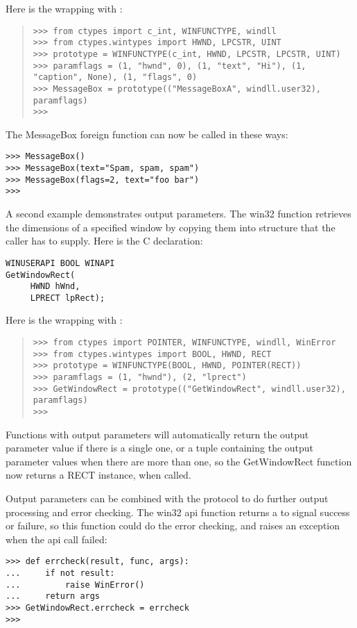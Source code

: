 Here is the wrapping with :
\begin{quote}
\begin{verbatim}>>> from ctypes import c_int, WINFUNCTYPE, windll
>>> from ctypes.wintypes import HWND, LPCSTR, UINT
>>> prototype = WINFUNCTYPE(c_int, HWND, LPCSTR, LPCSTR, UINT)
>>> paramflags = (1, "hwnd", 0), (1, "text", "Hi"), (1, "caption", None), (1, "flags", 0)
>>> MessageBox = prototype(("MessageBoxA", windll.user32), paramflags)
>>>\end{verbatim}
\end{quote}

The MessageBox foreign function can now be called in these ways:
\begin{verbatim}
>>> MessageBox()
>>> MessageBox(text="Spam, spam, spam")
>>> MessageBox(flags=2, text="foo bar")
>>>
\end{verbatim}

A second example demonstrates output parameters.  The win32
 function retrieves the dimensions of a specified
window by copying them into  structure that the caller has to
supply.  Here is the C declaration:
\begin{verbatim}
WINUSERAPI BOOL WINAPI
GetWindowRect(
     HWND hWnd,
     LPRECT lpRect);
\end{verbatim}

Here is the wrapping with :
\begin{quote}
\begin{verbatim}>>> from ctypes import POINTER, WINFUNCTYPE, windll, WinError
>>> from ctypes.wintypes import BOOL, HWND, RECT
>>> prototype = WINFUNCTYPE(BOOL, HWND, POINTER(RECT))
>>> paramflags = (1, "hwnd"), (2, "lprect")
>>> GetWindowRect = prototype(("GetWindowRect", windll.user32), paramflags)
>>>\end{verbatim}
\end{quote}

Functions with output parameters will automatically return the output
parameter value if there is a single one, or a tuple containing the
output parameter values when there are more than one, so the
GetWindowRect function now returns a RECT instance, when called.

Output parameters can be combined with the  protocol to do
further output processing and error checking.  The win32
 api function returns a  to signal success or
failure, so this function could do the error checking, and raises an
exception when the api call failed:
\begin{verbatim}
>>> def errcheck(result, func, args):
...     if not result:
...         raise WinError()
...     return args
>>> GetWindowRect.errcheck = errcheck
>>>
\end{verbatim}

